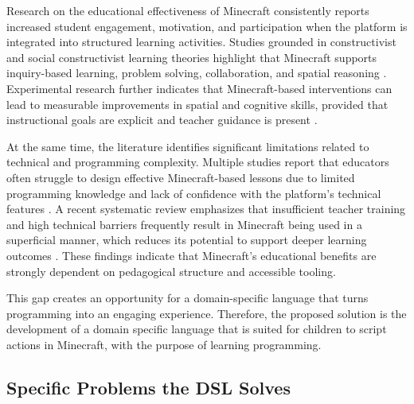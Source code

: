 Research on the educational effectiveness of Minecraft consistently reports increased student engagement, motivation, and participation when the platform is integrated into structured learning activities. 
Studies grounded in constructivist and social constructivist learning theories highlight that Minecraft supports inquiry-based learning, problem solving, collaboration, and spatial reasoning \cite{short_teaching_2012, kotsopoulos_pedagogical_2017}. 
Experimental research further indicates that Minecraft-based interventions can lead to measurable improvements in spatial and cognitive skills, provided that instructional goals are explicit and teacher guidance is present \cite{ming_exploring_2025}.

At the same time, the literature identifies significant limitations related to technical and programming complexity. 
Multiple studies report that educators often struggle to design effective Minecraft-based lessons due to limited programming knowledge and lack of confidence with the platform's technical features \cite{bower_improving_2017, nebel_mining_2016}. 
A recent systematic review emphasizes that insufficient teacher training and high technical barriers frequently result in Minecraft being used in a superficial manner, which reduces its potential to support deeper learning outcomes \cite{md_shamsudin_crafting_2024}. 
These findings indicate that Minecraft's educational benefits are strongly dependent on pedagogical structure and accessible tooling.


This gap creates an opportunity for a domain-specific language that turns programming into an engaging experience. 
Therefore, the proposed solution is the development of a domain specific language that is suited for children to script actions in Minecraft, with the purpose of learning programming.


\subsection{Specific Problems the DSL Solves}

